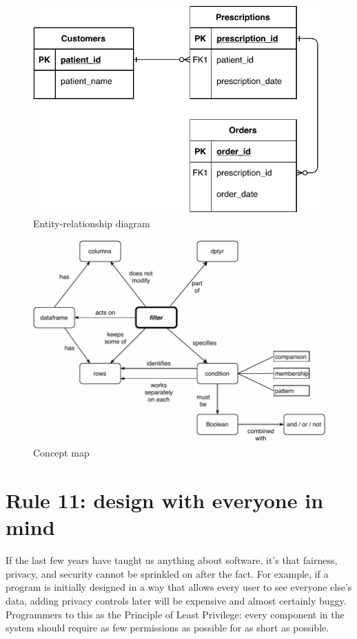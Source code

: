 \documentclass[10pt,letterpaper]{article}
\begin{document}
\begin{figure}
  \centering
  \includegraphics[scale=0.6]{er-diagram.pdf}
  \caption{Entity-relationship diagram}
  \label{er-diagram}
\end{figure}

\begin{figure}
  \centering
  \includegraphics[scale=0.6]{concept-map.pdf}
  \caption{Concept map}
  \label{concept-map}
\end{figure}

\section*{Rule 11: design with everyone in mind}

If the last few years have taught us anything about software,
it's that fairness, privacy, and security cannot be sprinkled on after the fact.
For example,
if a program is initially designed in a way that allows every user to see everyone else's data,
adding privacy controls later will be expensive and almost certainly buggy.
Programmers to this as the Principle of Least Privilege:
every component in the system should require as few permissions as possible
for as short as possible.
\end{document}
